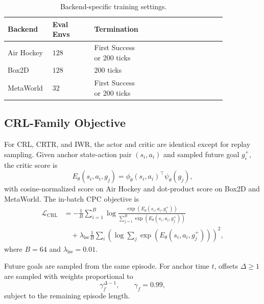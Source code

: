 \begin{table}[h]
\centering
\small
\setlength{\tabcolsep}{5pt}
\caption{Backend-specific training settings.}
\label{tab:appendix-backend-training}
\begin{tabular}{p{0.18\linewidth}p{0.18\linewidth}p{0.15\linewidth}p{0.34\linewidth}}
\toprule
Backend & Eval Envs & Termination \\
\midrule
Air Hockey & $128$ & First Success or 200 ticks \\
Box2D & $128$ & 200 ticks \\
MetaWorld & $32$ & First Success or 200 ticks \\
\bottomrule
\end{tabular}
\end{table}

\subsection{CRL-Family Objective}

For CRL, CRTR, and IWR, the actor and critic are identical except for replay
sampling.  Given anchor state-action pair $(s_i,a_i)$ and sampled future goal
$g_i^+$, the critic score is
\[
    E_\theta(s_i,a_i,g_j)
    =
    \phi_\theta(s_i,a_i)^\top \psi_\theta(g_j),
\]
with cosine-normalized score on Air Hockey and dot-product score on Box2D and
MetaWorld.  The in-batch CPC objective is
\[
    \begin{aligned}
    \mathcal L_{\mathrm{CRL}}
    &=
    -\frac{1}{B}
    \sum_{i=1}^{B}
    \log
    \frac{\exp(E_\theta(s_i,a_i,g_i^+))}
    {\sum_{j=1}^{B}\exp(E_\theta(s_i,a_i,g_j^+))}
    \\
    &\quad+
    \lambda_{\mathrm{lse}}
    \frac{1}{B}
    \sum_i
    \left(
        \log\sum_j \exp(E_\theta(s_i,a_i,g_j^+))
    \right)^2 ,
    \end{aligned}
\]
where $B=64$ and $\lambda_{\mathrm{lse}}=0.01$.

Future goals are sampled from the same episode.  For anchor time $t$, offsets
$\Delta\geq 1$ are sampled with weights proportional to
\[
    \gamma_f^{\Delta-1},
    \qquad
    \gamma_f = 0.99,
\]
subject to the remaining episode length.



